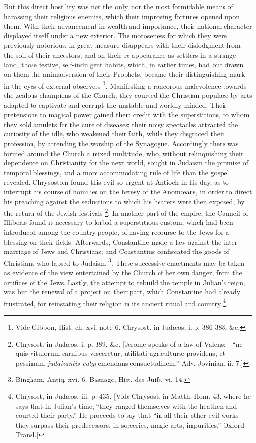 But this direct hostility was not the only, nor the most formidable
means of harassing their religious enemies, which their improving
fortunes opened upon them. With their advancement in wealth and
importance, their national character displayed itself under a new
exterior. The moroseness for which they were previously notorious, in
great measure disappears with their dislodgment from the soil of their
ancestors; and on their re-appearance as settlers in a strange land,
those festive, self-indulgent habits, which, in earlier times, had but
drawn on them the animadversion of their Prophets, became their
distinguishing mark in the eyes of external observers \footnote{Vide Gibbon, Hist. ch. xvi. note 6.
Chrysost. in Judæos, i. p. 386-388, \&c.}. Manifesting a rancorous malevolence towards the zealous
champions of the Church, they courted the Christian populace by arts
adapted to captivate and corrupt the unstable and worldly-minded.
Their pretensions to magical power gained them credit with the
superstitious, to whom they sold amulets for the cure of diseases;
their noisy spectacles attracted the curiosity of the idle, who
weakened their faith, while they disgraced their profession, by
attending the worship of the Synagogue. Accordingly there was formed
around the Church a mixed multitude, who, without relinquishing their
dependence on Christianity for the next world, sought in Judaism the
promise of temporal blessings, and a more accommodating rule of life
than the gospel revealed. Chrysostom found this evil so urgent at
Antioch in his day, as to interrupt his course of homilies on the
heresy of the Anomœans, in order to direct his preaching against the
seductions to which his hearers were then exposed, by the return of
the Jewish festivals \footnote{Chrysost. in Judæos, i. p. 389, \&c.
[Jerome speaks of a law of Valens:—``ne quis vitulorum carnibus
vesceretur, utilitati agriculturæ providens, et pessimam \emph{judaizantis}
\emph{vulgi} emendans consuetudinem.'' Adv. Jovinian. ii. 7.]}.
In another part of the empire, the Council of Illiberis found it
necessary to forbid a superstitious custom, which had been introduced
among the country people, of having recourse to the Jews for a
blessing on their fields. Afterwards, Constantine made a law against
the inter-marriage of Jews and Christians; and Constantius confiscated
the goods of Christians who lapsed to Judaism \footnote{Bingham, Antiq. xvi. 6. Basnage, Hist. des
Juifs, vi. 14.}. These successive enactments may be taken as evidence of the
view entertained by the Church of her own danger, from the artifices
of the Jews. Lastly, the attempt to rebuild the temple in Julian's
reign, was but the renewal of a project on their part, which
Constantine had already frustrated, for reinstating their religion in
its ancient ritual and country \footnote{Chrysost, in Judæos, iii. p. 435. [Vide
Chrysost. in Matth. Hom. 43, where he says that in Julian's time,
``they ranged themselves with the heathen and courted their
party.'' He proceeds to say that ``in all their other evil
works they surpass their predecessors, in sorceries, magic arts,
impurities.'' Oxford Transl.]}.


